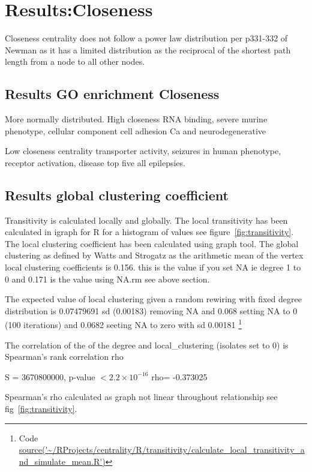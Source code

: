 \section{Results:Closeness}
Closeness centrality  does not follow a power law distribution per p331-332 of Newman as it has a limited distribution as the reciprocal of the shortest path length from a node to all other nodes. 
\subsection{Results GO enrichment Closeness}
More normally distributed.
High closeness RNA binding, severe murine phenotype, cellular component cell adhesion
Ca and neurodegenerative

Low closeness centrality transporter activity, seizures in human phenotype, receptor activation, disease top five all epilepsies. 

\subsection{Results global clustering coefficient}
Transitivity is calculated locally and globally. The local transitivity has been calculated in igraph for R for a histogram of values see figure~\ref{fig:transitivity}. The local clustering coefficient has been calculated using graph tool. 
The global clustering as defined by Watts and Strogatz as the arithmetic mean of the vertex local clustering coefficients is 0.156.\cite{watts1998collective} this is the value if you set NA ie degree 1 to 0 and 0.171 is the value using NA.rm see above section. 

The expected value of local clustering given a random rewiring with fixed degree distribution is 0.07479691 sd (0.00183) removing NA and 0.068 setting NA to 0 (100 iterations) and 0.0682 seeting NA to zero with sd 0.00181 \footnote{Code  \url{source('~/RProjects/centrality/R/transitivity/calculate_local_transitivity_and_simulate_mean.R')} }



The correlation of the of the degree and local\_clustering (isolates set to 0)  is 
	Spearman's rank correlation rho

S = 3670800000, p-value $< 2.2 \times 10^{-16}$
      rho= 
-0.373025 

Spearman's rho calculated as graph not linear throughout relationship see fig~\ref{fig:transitivity}.


